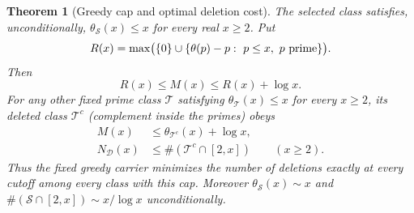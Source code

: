 \documentclass[11pt]{article}
\newtheorem{theorem}{Theorem}[section]
\theoremstyle{definition}
\begin{document}
\begin{theorem}[Greedy cap and optimal deletion cost]
\label{thm:greedy-prime-cap}
The selected class satisfies, unconditionally,
$\theta_{\mathcal S}(x)\le x$ for every real $x\ge2$.
Put
\begin{equation}
 R(x)=\max\bigl(\{0\}\cup
       \{\theta(p)-p:\ p\le x,\ p\ {\rm prime}\}\bigr).
 \label{eq:greedy-prime-regulator}
\end{equation}
Then
\begin{equation}
                     R(x)\le M(x)\le R(x)+\log x .
 \label{eq:greedy-prime-regulator-bound}
\end{equation}
For any other fixed prime class $\mathcal T$ satisfying
$\theta_{\mathcal T}(x)\le x$ for every $x\ge2$, its deleted
class $\mathcal T^c$ (complement inside the primes) obeys
\begin{equation}
 \begin{aligned}
 M(x)&\le\theta_{\mathcal T^c}(x)+\log x,\\
 N_{\mathcal D}(x)&\le
    \#(\mathcal T^c\cap[2,x])\qquad(x\ge2).
 \end{aligned}
 \label{eq:greedy-prime-count-optimality}
\end{equation}
Thus the fixed greedy carrier minimizes the number of deletions
exactly at every cutoff among every class with this cap.
Moreover $\theta_{\mathcal S}(x)\sim x$ and
$\#(\mathcal S\cap[2,x])\sim x/\log x$ unconditionally.
\end{theorem}
\end{document}
